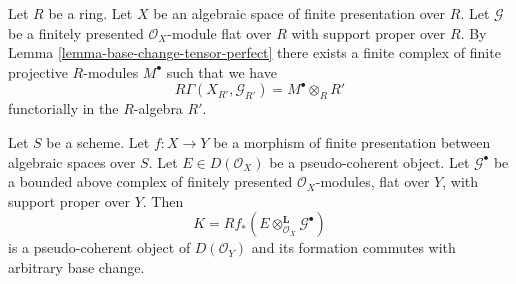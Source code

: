 \begin{remark}
\label{remark-explain-perfect-direct-image}
Let $R$ be a ring. Let $X$ be an algebraic space of finite presentation over
$R$. Let $\mathcal{G}$ be a finitely presented $\mathcal{O}_X$-module
flat over $R$ with support proper over $R$. By
Lemma \ref{lemma-base-change-tensor-perfect}
there exists a finite complex of finite projective $R$-modules
$M^\bullet$ such that we have
$$
R\Gamma(X_{R'}, \mathcal{G}_{R'}) = M^\bullet \otimes_R R'
$$
functorially in the $R$-algebra $R'$.
\end{remark}

\begin{lemma}
\label{lemma-base-change-tensor-pseudo-coherent}
Let $S$ be a scheme.
Let $f : X \to Y$ be a morphism of finite presentation
between algebraic spaces over $S$.
Let $E \in D(\mathcal{O}_X)$ be a pseudo-coherent object.
Let $\mathcal{G}^\bullet$ be a bounded above complex of
finitely presented $\mathcal{O}_X$-modules,
flat over $Y$, with support proper over $Y$. Then
$$
K = Rf_*(E \otimes_{\mathcal{O}_X}^\mathbf{L} \mathcal{G}^\bullet)
$$
is a pseudo-coherent object of $D(\mathcal{O}_Y)$ and its formation
commutes with arbitrary base change.
\end{lemma}

